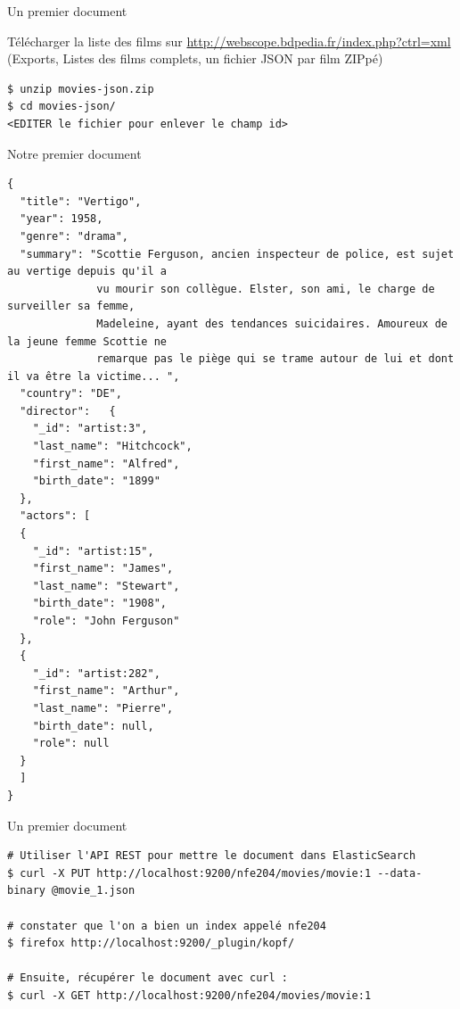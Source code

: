 \begin{frame}[fragile]{Un premier document}

  Télécharger la liste des films sur \url{http://webscope.bdpedia.fr/index.php?ctrl=xml}
  (Exports, Listes des films complets, un fichier JSON par film ZIPpé)
  \begin{verbatim}
$ unzip movies-json.zip
$ cd movies-json/
<EDITER le fichier pour enlever le champ id>
\end{verbatim} 
\end{frame}
\begin{frame}[fragile]{Notre premier document}
  \begin{verbatim}
{
  "title": "Vertigo",
  "year": 1958,
  "genre": "drama",
  "summary": "Scottie Ferguson, ancien inspecteur de police, est sujet au vertige depuis qu'il a 
              vu mourir son collègue. Elster, son ami, le charge de surveiller sa femme, 
              Madeleine, ayant des tendances suicidaires. Amoureux de la jeune femme Scottie ne 
              remarque pas le piège qui se trame autour de lui et dont il va être la victime... ",
  "country": "DE",
  "director": 	{
    "_id": "artist:3",
    "last_name": "Hitchcock",
    "first_name": "Alfred",
    "birth_date": "1899"	
  },
  "actors": [
  {
    "_id": "artist:15",
    "first_name": "James",
    "last_name": "Stewart",
    "birth_date": "1908",
    "role": "John Ferguson"	
  },
  {
    "_id": "artist:282",
    "first_name": "Arthur",
    "last_name": "Pierre",
    "birth_date": null,
    "role": null	
  }
  ]
}
\end{verbatim} 
\end{frame}

\begin{frame}[fragile]{Un premier document}
  \begin{verbatim}
# Utiliser l'API REST pour mettre le document dans ElasticSearch
$ curl -X PUT http://localhost:9200/nfe204/movies/movie:1 --data-binary @movie_1.json

# constater que l'on a bien un index appelé nfe204
$ firefox http://localhost:9200/_plugin/kopf/

# Ensuite, récupérer le document avec curl :
$ curl -X GET http://localhost:9200/nfe204/movies/movie:1
\end{verbatim}
\end{frame}


